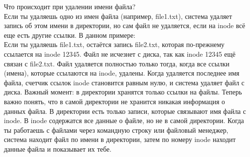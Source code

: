 Что происходит при удалении имени файла? \\
Если ты удаляешь одно из имен файла (например, file1.txt), система удаляет запись об этом имени в директории, но сам файл не удаляется, если на inode всё еще есть другие ссылки. В данном примере: \\
Если ты удаляешь file1.txt, остаётся запись file2.txt, которая по-прежнему ссылается на inode 12345. Файл не исчезнет с диска, так как inode 12345 ещё связан с file2.txt. Файл удаляется полностью только тогда, когда все ссылки (имена), которые ссылаются на inode, удалены. Когда удаляется последнее имя файла, счетчик ссылок inode становится равным нулю, и система удаляет файл с диска. Важный момент: в директории хранятся только ссылки на файлы. Теперь важно понять, что в самой директории не хранится никакая информация о данных файла. В директории есть только записи, которые связывают имя файла с inode. В inode содержатся все данные о файле, но не в самой директории. Когда ты работаешь с файлами через командную строку или файловый менеджер, система находит файл по имени в директории, затем по номеру inode находит данные файла и показывает их тебе.
